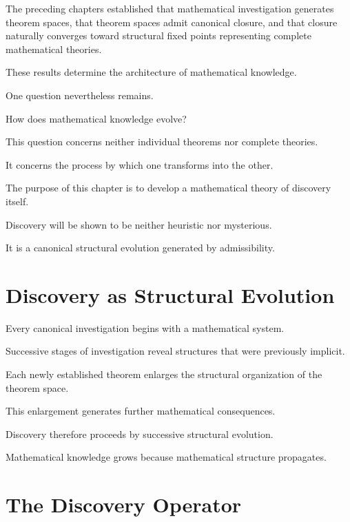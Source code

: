 \documentclass[13pt,openany]{book}
\theoremstyle{plain}
\theoremstyle{definition}
\begin{document}
The preceding chapters established that mathematical investigation generates
theorem spaces, that theorem spaces admit canonical closure, and that closure
naturally converges toward structural fixed points representing complete
mathematical theories.

These results determine the architecture of mathematical knowledge.

One question nevertheless remains.

How does mathematical knowledge evolve?

This question concerns neither individual theorems nor complete theories.

It concerns the process by which one transforms into the other.

The purpose of this chapter is to develop a mathematical theory of discovery
itself.

Discovery will be shown to be neither heuristic nor mysterious.

It is a canonical structural evolution generated by admissibility.

\section{Discovery as Structural Evolution}

Every canonical investigation begins with a mathematical system.

Successive stages of investigation reveal structures that were previously
implicit.

Each newly established theorem enlarges the structural organization of the
theorem space.

This enlargement generates further mathematical consequences.

Discovery therefore proceeds by successive structural evolution.

Mathematical knowledge grows because mathematical structure propagates.

\section{The Discovery Operator}
\end{document}
